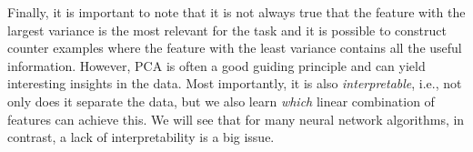 Finally, it is important to note that it is not always true that the feature with the largest variance is the most relevant for the task and it is possible to construct counter examples where the feature with the least variance contains all the useful information. However, PCA is often a good guiding principle and can yield interesting insights in the data. Most importantly, it is also \emph{interpretable}, i.e., not only does it separate the data, but we also learn \emph{which} linear combination of features can achieve this. We will see that for many neural network algorithms, in contrast, a lack of interpretability is a big issue.
